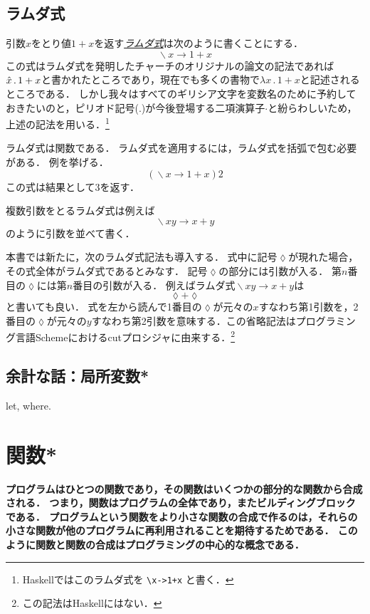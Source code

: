 \documentclass[twocolumn]{jsbook}
\newcommand{\keyword}[1]{\underline{\emph{#1}}}
\newcommand{\code}[1]{\texttt{#1}}
\newenvironment{leader}{\begingroup\bf}{\endgroup}
\DeclareMathOperator{\mathLambda}{\backslash}
\newcommand{\mathLambdaAnonymousParameter}{\lozenge}
\newcommand{\mathLambdaArrow}{\rightarrow}
\newcommand{\mathLambdaExpression}[2]{\mathLambda#1\mathLambdaArrow#2}
\begin{document}
\section{ラムダ式}
引数$x$をとり値$1+x$を返す\keyword{ラムダ式}は次のように書くことにする．
$$\mathLambdaExpression{x}{1+x}$$
この式はラムダ式を発明したチャーチのオリジナルの論文の記法であれば$\Hat x\,.\,1+x$と書かれたところであり，現在でも多くの書物で$\lambda x\,.\,1+x$と記述されるところである．
しかし我々はすべてのギリシア文字を変数名のために予約しておきたいのと，ピリオド記号($.$)が今後登場する二項演算子$\cdot$と紛らわしいため，上述の記法を用いる．\footnote{Haskellではこのラムダ式を \code{\textbackslash x->1+x} と書く．}

ラムダ式は関数である．
ラムダ式を適用するには，ラムダ式を括弧で包む必要がある．
例を挙げる．
$$\left(\mathLambdaExpression{x}{1+x}\right)2$$
この式は結果として$3$を返す．

複数引数をとるラムダ式は例えば$$\mathLambdaExpression{xy}{x+y}$$のように引数を並べて書く．

本書では新たに，次のラムダ式記法も導入する．
式中に記号$\mathLambdaAnonymousParameter$が現れた場合，その式全体がラムダ式であるとみなす．
記号$\mathLambdaAnonymousParameter$の部分には引数が入る．
第$n$番目の$\mathLambdaAnonymousParameter$には第$n$番目の引数が入る．
例えばラムダ式$\mathLambdaExpression{xy}{x+y}$は$$\mathLambdaAnonymousParameter+\mathLambdaAnonymousParameter$$と書いても良い．
式を左から読んで1番目の$\mathLambdaAnonymousParameter$が元々の$x$すなわち第1引数を，2番目の$\mathLambdaAnonymousParameter$が元々の$y$すなわち第2引数を意味する．この省略記法はプログラミング言語Schemeにおけるcutプロシジャに由来する．\footnote{この記法はHaskellにはない．}

\section*{余計な話：局所変数*}

let, where.

\chapter{関数*}

\begin{leader}
プログラムはひとつの関数であり，その関数はいくつかの部分的な関数から合成される．
つまり，関数はプログラムの全体であり，またビルディングブロックである．
プログラムという関数をより小さな関数の合成で作るのは，それらの小さな関数が他のプログラムに再利用されることを期待するためである．
このように関数と関数の合成はプログラミングの中心的な概念である．
\end{leader}
\end{document}
